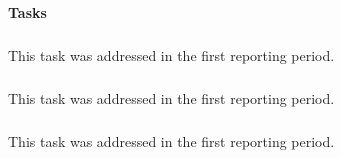 \paragraph{Tasks}
\medskip

\subparagraph{}
\label{dksbases@data-assessment}
This task was addressed in the first reporting period.
\medskip

\subparagraph{}
\label{dksbases@data-triform}
This task was addressed in the first reporting period.
\medskip

\subparagraph{}
\label{dksbases@data-design}
This task was addressed in the first reporting period.

